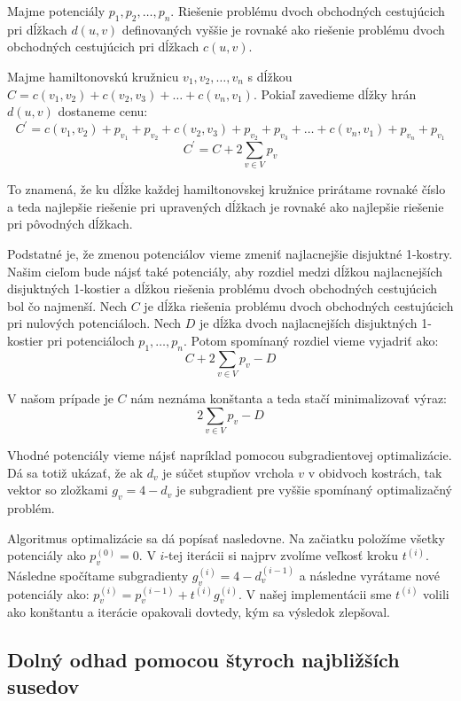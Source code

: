 \begin{lema}
Majme potenciály $p_1, p_2, \dots, p_n$. Riešenie problému dvoch obchodných
cestujúcich pri dĺžkach $d(u,v)$ definovaných vyššie je rovnaké ako riešenie
problému dvoch obchodných cestujúcich pri dĺžkach $c(u,v)$.
\end{lema}

\begin{dokaz}
Majme hamiltonovskú kružnicu $v_1, v_2, \dots, v_n$ s dĺžkou $C = c(v_1, v_2) + c(v_2, v_3) +
\dots + c(v_n, v_1)$. Pokiaľ zavedieme dĺžky hrán $d(u,v)$ dostaneme cenu:
$$C^{'} = c(v_1, v_2) + p_{v_1} + p_{v_2} + c(v_2, v_3) + p_{v_2} + p_{v_3} + \dots +
c(v_n, v_1) + p_{v_n} + p_{v_1}$$
$$C^{'} = C + 2 \sum_{v \in V} p_v$$

To znamená, že ku dĺžke každej hamiltonovskej kružnice prirátame rovnaké číslo
a teda najlepšie riešenie pri upravených dĺžkach je rovnaké ako najlepšie
riešenie pri pôvodných dĺžkach.
\end{dokaz}

Podstatné je, že zmenou potenciálov vieme zmeniť najlacnejšie disjuktné 1-kostry. 
Našim cieľom bude nájsť také potenciály, aby rozdiel medzi dĺžkou najlacnejších
disjuktných 1-kostier a dĺžkou riešenia problému dvoch obchodných cestujúcich
bol čo najmenší. Nech $C$ je dĺžka riešenia problému dvoch obchodných cestujúcich
pri nulových potenciáloch. Nech $D$ je dĺžka dvoch najlacnejších disjuktných 1-kostier
pri potenciáloch $p_1, \dots, p_n$. Potom spomínaný rozdiel vieme vyjadriť ako:
$$C + 2 \sum_{v \in V} p_v - D$$

V našom prípade je $C$ nám neznáma konštanta a teda stačí minimalizovať výraz:
$$2 \sum_{v \in V} p_v - D$$

Vhodné potenciály vieme nájsť napríklad pomocou subgradientovej optimalizácie.
Dá sa totiž ukázať, že ak $d_v$ je súčet stupňov vrchola $v$ v obidvoch kostrách, tak
vektor so zložkami $g_v = 4 - d_v$ je subgradient pre vyššie spomínaný optimalizačný
problém.

Algoritmus optimalizácie sa dá popísať nasledovne. Na začiatku položíme všetky potenciály
ako $p^{(0)}_v = 0$. V $i$-tej iterácii si najprv zvolíme veľkosť kroku $t^{(i)}$. Následne
spočítame subgradienty $g^{(i)}_v = 4 - d^{(i-1)}_v$ a následne vyrátame nové potenciály ako:
$p^{(i)}_v = p^{(i-1)}_v + t^{(i)} g^{(i)}_v$. V našej implementácii sme $t^{(i)}$ volili ako
konštantu a iterácie opakovali dovtedy, kým sa výsledok zlepšoval.

\subsection{Dolný odhad pomocou štyroch najbližších susedov}

